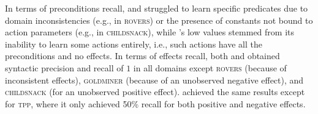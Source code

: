 In terms of preconditions recall, \offlam{} and \nolam{} struggled to learn specific predicates due to domain inconsistencies (e.g., in \textsc{rovers}) or the presence of constants not bound to action parameters (e.g., in \textsc{childsnack}), while \samshort{}'s low values stemmed from its inability to learn some actions entirely, i.e., such actions have all the preconditions and no effects.
In terms of effects recall, both \offlam{} and \nolam obtained syntactic precision and recall of $1$ in all domains except \textsc{rovers} (because of inconsistent effects), \textsc{goldminer} (because of an unobserved negative effect), and \textsc{childsnack} (for an unobserved positive effect). \samshort{} achieved the same results except for \textsc{tpp}, where it only achieved 50\% recall for both positive and negative effects.
